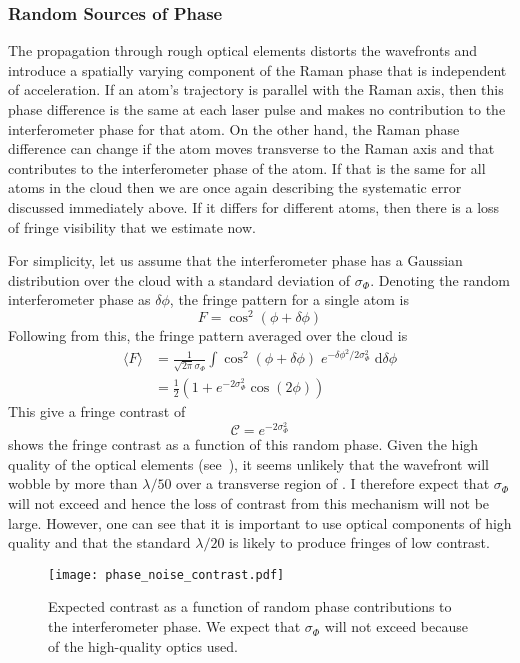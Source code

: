 \subsubsection{Random Sources of Phase}
The propagation through rough optical elements distorts
the wavefronts and introduce a spatially varying component of the
Raman phase that is independent
of acceleration. If an atom's trajectory is parallel with the Raman axis,
then this phase difference is the same at each laser pulse and makes
no contribution to the interferometer phase for that atom. On the other hand, 
the Raman phase difference can change if the atom moves transverse to
the Raman axis and that contributes to the interferometer phase of the
atom. If that is the same for all atoms in the cloud then we are once
again describing the systematic error discussed immediately above. If
it differs for different atoms, then there is a loss of fringe
visibility that we estimate now.
\par\noindent 
For simplicity, let us assume that the interferometer phase has a
Gaussian distribution over the cloud with a standard deviation of \(\sigma_\Phi 
\). Denoting the random interferometer phase as \(\delta\phi\), the
fringe pattern for a single atom is
\begin{equation}
	F = \cos^2\left(\phi + \delta\phi\right)
\end{equation}
Following from this, the fringe pattern averaged over the cloud is
\begin{align}
  \langle F \rangle & = \frac{1}{\sqrt{2\pi}\sigma_\Phi}\int
  \cos^2(\phi+\delta \phi) \; e^{-\delta\phi^2/2\sigma_\Phi^2} \; \mathrm{d}\delta\phi \\
                    &= \frac{1}{2}(1+e^{-2\sigma_{\Phi}^2}\cos(2\phi)) 
\end{align}
This give a fringe contrast of
\begin{equation}
    \mathcal{C} = e^{-2 \sigma_\Phi^2}
\end{equation}
 shows the fringe contrast as a
function of this random phase. Given the high quality of the optical
elements (see~), it seems unlikely
that the wavefront will wobble by more than $\lambda/50$ over a
transverse region of . I therefore expect that
$\sigma_\Phi$ will not exceed  and hence
the loss of contrast from this mechanism will not be large. However,
one can see that it is important to use optical components of high
quality and that the standard $\lambda/20$ is likely to produce
fringes of low contrast.
\begin{figure}[htbp]
	\centering
	\texttt{[image: phase\_noise\_contrast.pdf]}
  \caption[Expected fringe contrast as a function of random phase
  contributions.]{Expected contrast as a function of random phase
  contributions to the interferometer phase. We expect that
$\sigma_\Phi$ will not exceed  because of the
high-quality optics used.}
	\label{fig:raman_phasenoise}
\end{figure}
\par\noindent
